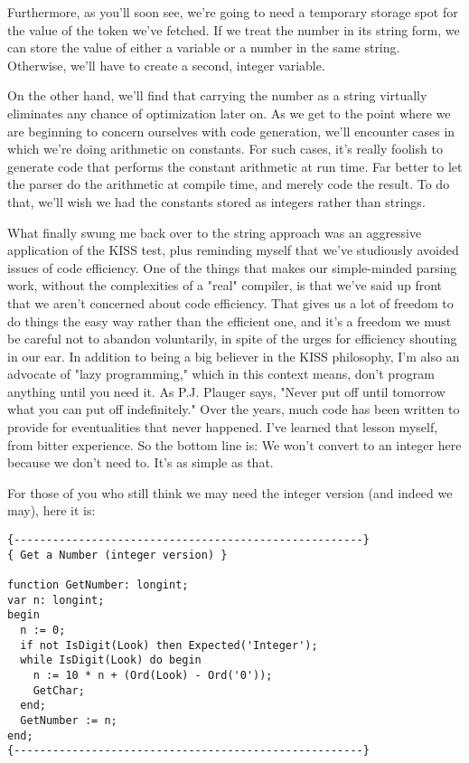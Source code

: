 Furthermore, as you'll soon see, we're going to need a temporary storage spot for the value of the token we've fetched. If we treat the number in its string form, we can store the value of either a variable or a number in the same string. Otherwise, we'll have to create a second, integer variable.

On the other hand, we'll find that carrying the number as a string virtually eliminates any chance of optimization later on. As we get to the point where we are beginning to concern ourselves with code generation, we'll encounter cases in which we're doing arithmetic on constants. For such cases, it's really foolish to generate code that performs the constant arithmetic at run time. Far better to let the parser do the arithmetic at compile time, and merely code the result. To do that, we'll wish we had the constants stored as integers rather than strings.

What finally swung me back over to the string approach was an aggressive application of the KISS test, plus reminding myself that we've studiously avoided issues of code efficiency. One of the things that makes our simple-minded parsing work, without the complexities of a "real" compiler, is that we've said up front that we aren't concerned about code efficiency. That gives us a lot of freedom to do things the easy way rather than the efficient one, and it's a freedom we must be careful not to abandon voluntarily, in spite of the urges for efficiency shouting in our ear. In addition to being a big believer in the KISS philosophy, I'm also an advocate of "lazy programming," which in this context means, don't program anything until you need it. As P.J. Plauger says, "Never put off until tomorrow what you can put off indefinitely."  Over the years, much code has been written to provide for eventualities that never happened. I've learned that lesson myself, from bitter experience. So the bottom line is:  We won't convert to an integer here because we don't need to. It's as simple as that.

For those of you who still think we may need the integer version (and indeed we may), here it is:

\begin{verbatim}
{------------------------------------------------------}
{ Get a Number (integer version) }

function GetNumber: longint;
var n: longint;
begin
  n := 0;
  if not IsDigit(Look) then Expected('Integer');
  while IsDigit(Look) do begin
    n := 10 * n + (Ord(Look) - Ord('0'));
    GetChar;
  end;
  GetNumber := n;
end;
{------------------------------------------------------}
\end{verbatim}

